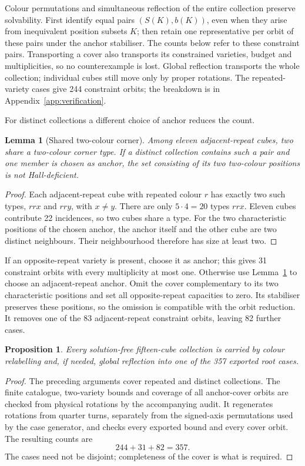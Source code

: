\documentclass[11pt]{article}
\newtheorem{lemma}[theorem]{Lemma}
\newtheorem{proposition}[theorem]{Proposition}
\theoremstyle{remark}
\begin{document}
Colour permutations and simultaneous reflection of the entire collection
preserve solvability. First identify equal pairs $(S(K),b(K))$, even when
they arise from inequivalent position subsets $K$; then retain one
representative per orbit of these pairs under the anchor stabiliser.
The counts below refer to these constraint pairs. Transporting a cover
also transports its constrained varieties, budget and multiplicities, so
no counterexample is lost. Global reflection transports the whole
collection; individual cubes still move only by proper rotations.
The repeated-variety cases give 244 constraint orbits; the breakdown is in
Appendix~\ref{app:verification}.

For distinct collections a different choice of anchor reduces the count.
\begin{lemma}[Shared two-colour corner]\label{lem:shared}
Among eleven adjacent-repeat cubes, two share a two-colour corner type.
If a distinct collection contains such a pair and one member is chosen as
anchor, the set consisting of its two two-colour positions is not
Hall-deficient.
\end{lemma}
\begin{proof}
Each adjacent-repeat cube with repeated colour $r$ has exactly two such
types, $rrx$ and $rry$, with $x\ne y$. There are only $5\cdot4=20$ types $rrx$. Eleven cubes contribute
22 incidences, so two cubes share a type. For the two characteristic positions
of the chosen anchor, the anchor itself and the other cube are two distinct
neighbours. Their neighbourhood therefore has size at least two.
\end{proof}
If an opposite-repeat variety is present, choose it as anchor; this gives
31 constraint orbits with every multiplicity at most one. Otherwise use
Lemma~\ref{lem:shared} to choose an adjacent-repeat anchor. Omit the cover
complementary to its two characteristic positions and set all opposite-repeat
capacities to zero. Its stabiliser preserves these positions, so the omission
is compatible with the orbit reduction. It removes one of the 83
adjacent-repeat constraint orbits, leaving 82 further cases.

\begin{proposition}\label{prop:cover}
Every solution-free fifteen-cube collection is carried by colour relabelling
and, if needed, global reflection into one of the 357 exported root cases.
\end{proposition}
\begin{proof}
The preceding arguments cover repeated and distinct collections. The finite
catalogue, two-variety bounds and coverage of all anchor-cover orbits are
checked from physical rotations by the accompanying audit. It regenerates
rotations from quarter turns, separately from the signed-axis permutations
used by the case generator, and checks every exported bound and every cover
orbit. The resulting counts are
\[
  244+31+82=357.
\]
The cases need not be disjoint; completeness of the cover is what is required.
\end{proof}
\end{document}

